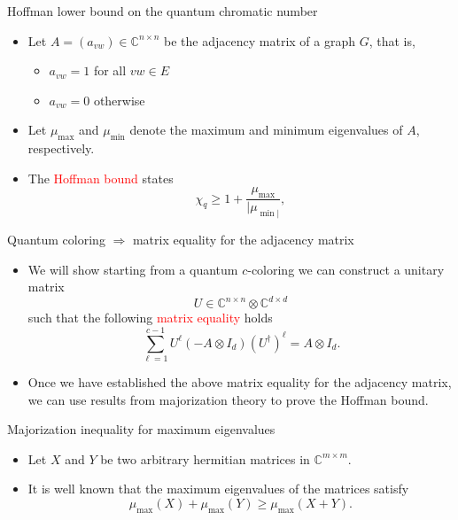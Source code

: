 \documentclass{beamer}
\newcommand{\C}{\mathbb{C}}
\renewcommand{\>}{\rangle}
\newcommand{\<}{\langle}
\begin{document}
\begin{frame}{Hoffman lower bound on the quantum chromatic number}

\begin{itemize}
\item Let $A=(a_{vw})\in\C^{n\times n}$ be the adjacency matrix of a graph $G$, that is, 

\begin{itemize}
\item $a_{vw}=1$ for all $vw\in E$ 
\item $a_{vw}=0$ otherwise
\end{itemize}

\item Let $\mu_{\max}$ and $\mu_{\min}$ denote the maximum and minimum eigenvalues of $A$, respectively.

\item The \textcolor{red}{Hoffman bound} states
\[
\chi_q \ge 1 + \frac{\mu_{\max}}{|\mu_{\min|}},
\]

\end{itemize}
\end{frame}

%

\begin{frame}{Quantum coloring $\Rightarrow$ matrix equality for the adjacency matrix}

\begin{itemize}
\item We will show starting from a quantum $c$-coloring we can construct a unitary matrix 
\[
U\in \C^{n\times n}\otimes\C^{d\times d}
\]
such that the following \textcolor{red}{matrix equality} holds
\[
\sum_{\ell=1}^{c-1} U^\ell (-A\otimes I_d) (U^\dagger)^\ell = A \otimes I_d.
\]

\item Once we have established the above matrix equality for the adjacency matrix, we can use results from majorization theory to prove the Hoffman bound.
\end{itemize}

\end{frame}

%

\begin{frame}{Majorization inequality for maximum eigenvalues}

\begin{itemize}
\item Let $X$ and $Y$ be two arbitrary hermitian matrices in $\C^{m\times m}$.

\item It is well known that the maximum eigenvalues of the matrices satisfy 
\[
\mu_{\max}(X) + \mu_{\max}(Y) \ge \mu_{\max}(X + Y).
\]
\end{itemize}
\end{frame}
\end{document}
